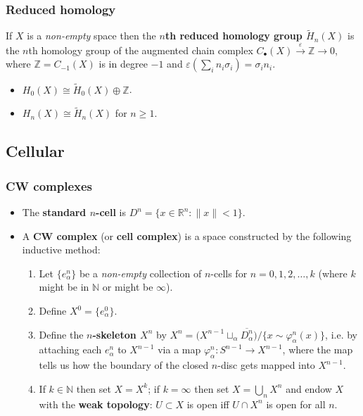 \documentclass[10pt]{article}
\newcommand{\rr}{\mathbb{R}}
\newcommand{\zz}{\mathbb{Z}}
\newcommand{\nn}{\mathbb{N}}
\newcommand{\reduced}[1]{\widetilde{#1}}
\begin{document}
            \subsubsection{Reduced homology}

                If $X$ is a \emph{non-empty} space then the \textbf{$n$th reduced homology group $\reduced{H}_n(X)$} is the $n$th homology group of the augmented chain complex $C_\bullet(X)\xrightarrow{\varepsilon}\zz\to0$, where $\zz=C_{-1}(X)$ is in degree $-1$ and $\varepsilon\left(\sum_i n_i\sigma_i\right)=\sigma_i n_i$.

                \begin{itemize}
                    \item $H_0(X)\cong\reduced{H}_0(X)\oplus\zz$.
                    \item $H_n(X)\cong\reduced{H}_n(X)$ for $n\geqslant1$.
                \end{itemize}

        \subsection{Cellular}

            \subsubsection{CW complexes}

                \begin{itemize}
                    \item The \textbf{standard $n$-cell} is $D^n=\{x\in\rr^n : \|x\|<1\}$.
                    \item A \textbf{CW complex} (or \textbf{cell complex}) is a space constructed by the following inductive method:
                        \begin{enumerate}
                            \item Let $\{e_\alpha^n\}$ be a \emph{non-empty} collection of $n$-cells for $n=0,1,2,\ldots,k$ (where $k$ might be in $\nn$ or might be $\infty$).
                            \item Define $X^0=\{e_\alpha^0\}$.
                            \item Define the \textbf{$n$-skeleton $X^n$} by \mbox{$X^n=\big(X^{n-1}\sqcup_\alpha \overline{D_\alpha^n}\big)/\{x\sim\varphi_\alpha^n(x)\}$}, i.e. by attaching each $e_\alpha^n$ to $X^{n-1}$ via a map $\varphi_\alpha^n\colon S^{n-1}\to X^{n-1}$, where the map tells us how the boundary of the closed $n$-disc gets mapped into $X^{n-1}$.
                            \item If $k\in\nn$ then set $X=X^k$; if $k=\infty$ then set $X=\bigcup_n X^n$ and endow $X$ with the \textbf{weak topology}: $U\subset X$ is open iff $U\cap X^n$ is open for all $n$.
                        \end{enumerate}
                \end{itemize}
\end{document}
